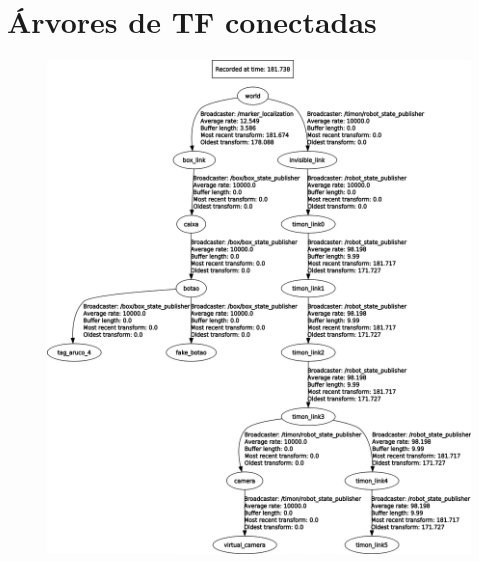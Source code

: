 \documentclass[
12pt,					%
openright,				%
twoside,				%
a4paper,				%
english,
brazil
]{ABNT/abntex2_report}
\begin{document}
	\chapter{Árvores de TF conectadas}
	\label{apend:tf2}
	\begin{figure}[H]
		\centering
		\includegraphics[scale=0.4]{appendix/tf_conectadas.png}
	\end{figure}
\end{document}
